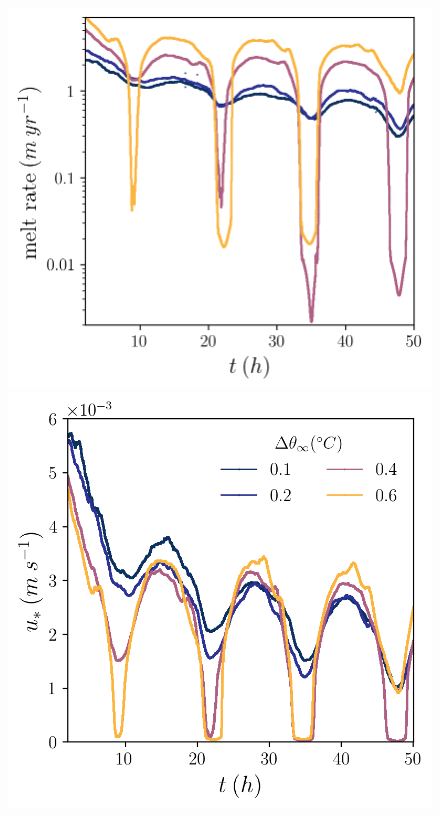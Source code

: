 \documentclass[draft]{agujournal2019}
\begin{document}
\begin{figure}[h!]
    \centering
    \begin{minipage}{0.4\textwidth}
        \includegraphics[trim={0 0cm 0 0},clip,width=\textwidth]{Figures/melt_cmp_dT_t.png}
    \end{minipage}%
    \begin{minipage}{0.4\textwidth}
        \includegraphics[trim={0 0cm 0 0},clip,width=\textwidth]{Figures/us_cmp_dT_t.png}

\end{minipage}
\end{figure}
\end{document}
